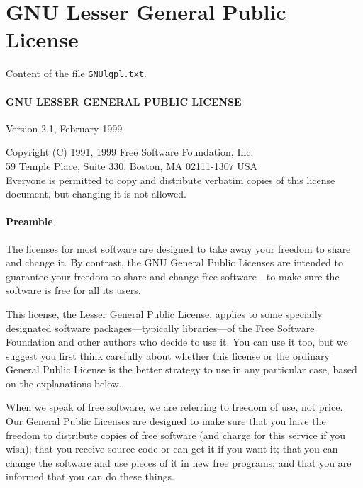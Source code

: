 
\chapter{GNU Lesser General Public License}
\label{chap:gnulgpl}

Content of the file {\tt GNUlgpl.txt}.

\subsubsection*{GNU LESSER GENERAL PUBLIC LICENSE}

Version 2.1, February 1999

\noindent Copyright (C) 1991, 1999 Free Software Foundation, Inc. \\
59 Temple Place, Suite 330, Boston, MA  02111-1307  USA \\
Everyone is permitted to copy and distribute verbatim copies of this
license document, but changing it is not allowed.


\subsubsection*{Preamble}

The licenses for most software are designed to take away your freedom
to share and change it.  By contrast, the GNU General Public Licenses
are intended to guarantee your freedom to share and change free
software---to make sure the software is free for all its users.

This license, the Lesser General Public License, applies to some
specially designated software packages---typically libraries---of the
Free Software Foundation and other authors who decide to use it.  You
can use it too, but we suggest you first think carefully about whether
this license or the ordinary General Public License is the better
strategy to use in any particular case, based on the explanations
below.

When we speak of free software, we are referring to freedom of use,
not price.  Our General Public Licenses are designed to make sure that
you have the freedom to distribute copies of free software (and charge
for this service if you wish); that you receive source code or can get
it if you want it; that you can change the software and use pieces of
it in new free programs; and that you are informed that you can do
these things.

